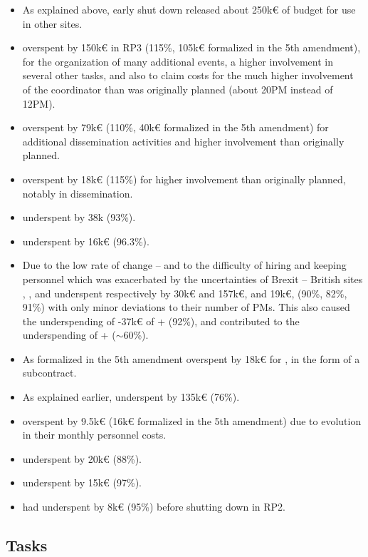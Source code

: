 \begin{itemize}
\item As explained above,  early shut down released about
  250k€ of budget for use in other sites.
\item {} overspent by 150k€ in RP3 (115\%, 105k€ formalized in
  the 5th amendment), for the organization of many additional events,
  a higher involvement in several other tasks, and also to claim costs
  for the much higher involvement of the coordinator than was
  originally planned (about 20PM instead of 12PM).
\item {} overspent by 79k€ (110\%, 40k€ formalized in the 5th
  amendment) for additional dissemination activities and higher
  involvement than originally planned.
\item {} overspent by 18k€ (115\%) for higher involvement than
  originally planned, notably in dissemination.
\item {} underspent by 38k (93\%).
\item {} underspent by 16k€ (96.3\%).
\item Due to the low rate of change -- and to the difficulty of
  hiring and keeping personnel which was exacerbated by the uncertainties
  of Brexit -- British sites ,
  , and  underspent respectively by 30k€ and 157k€,
  and 19k€, (90\%, 82\%, 91\%) with only minor deviations to their
  number of PMs. This also caused the underspending of -37k€ of
  + (92\%), and contributed to the underspending
  of + ($\sim$60\%).
\item As formalized in the 5th amendment  overspent by 18k€
  for , in the form of a subcontract.
\item As explained earlier,  underspent by 135k€ (76\%).
\item {} overspent by 9.5k€ (16k€ formalized in the 5th
  amendment) due to evolution in their monthly personnel costs.
\item {} underspent by 20k€ (88\%).
\item {} underspent by 15k€ (97\%).
\item {} had underspent by 8k€ (95\%) before shutting down in
  RP2.
\end{itemize}

\subsection{Tasks}

